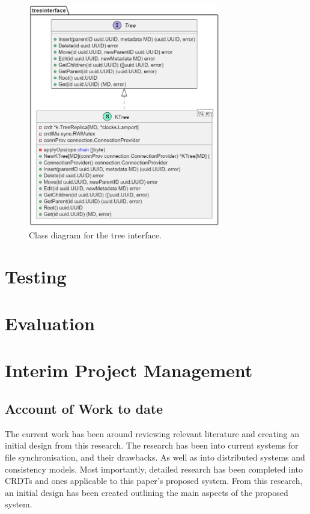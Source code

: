 \documentclass[12pt]{report}
\begin{document}
\begin{figure}[H]
    \centering
    \includegraphics[width=0.75\textwidth]{images/ktree_impl.jpg}
    \caption{Class diagram for the tree interface.}
    \label{fig:treeimpl}
\end{figure}


\chapter{Testing}

\chapter{Evaluation}

\printbibliography

\appendix

\chapter{Interim Project Management}

\section{Account of Work to date}
The current work has been around reviewing relevant literature and creating an initial design from this research. The research has been into current systems for file synchronisation, and their drawbacks. As well as into distributed systems and consistency models. Most importantly, detailed research has been completed into CRDTs and ones applicable to this paper's proposed system. From this research, an initial design has been created outlining the main aspects of the proposed system.
\end{document}
